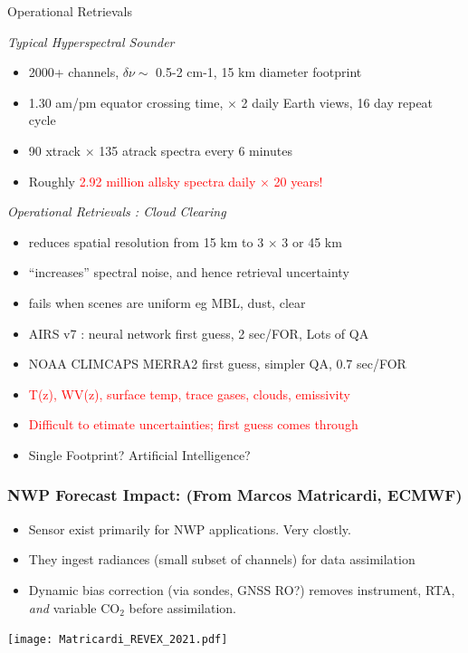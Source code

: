 \documentclass[10pt,t]{beamer}
\begin{document}
\begin{frame}[shrink=2]{Operational Retrievals}
\vspace{-0.11in}

\emph{Typical Hyperspectral Sounder}
\vspace{-0.1in}
\begin{itemize}
  \item 2000+ channels, $\delta \nu \sim$ 0.5-2 cm-1, 15 km diameter footprint
  \item 1.30 am/pm equator crossing time, $\times$ 2 daily Earth views, 16 day repeat cycle
  \item 90 xtrack $\times$ 135 atrack spectra every 6 minutes
  \item Roughly \textcolor{red}{2.92 million  allsky spectra daily $\times$ 20 years!}
\end{itemize}

\vspace{0.10in}

\emph{Operational Retrievals : Cloud Clearing}
\vspace{-0.1in}
\begin{itemize}
  \item reduces spatial resolution from 15 km to 3 $\times$ 3 or 45 km
  \item ``increases'' spectral noise, and hence retrieval uncertainty
  \item fails when scenes are uniform eg MBL, dust, clear
  \item AIRS v7 : neural network first guess, 2 sec/FOR, Lots of QA
  \item NOAA CLIMCAPS MERRA2 first guess, simpler QA, 0.7 sec/FOR
  \item \textcolor{red}{T(z), WV(z), surface temp, trace gases, clouds, emissivity}
  \item \textcolor{red}{Difficult to etimate uncertainties; first guess comes through}
  \item Single Footprint? Artificial Intelligence?
\end{itemize}

\end{frame}
\begin{frame}
  \frametitle{NWP Forecast Impact: \small (From Marcos Matricardi, ECMWF)}
  \vspace{-0.1in}
  \begin{small}
  \begin{itemize}
  \item Sensor exist primarily for NWP applications.  Very clostly.
  \item They ingest radiances (small subset of channels) for data assimilation
  \item Dynamic bias correction (via sondes, GNSS RO?) removes instrument, RTA, \textit{and} variable CO$_2$ before assimilation.
\end{itemize}
  \end{small}
  \vspace{-0.45in}
  \texttt{[image: Matricardi\_REVEX\_2021.pdf]}
\end{frame}
\end{document}
